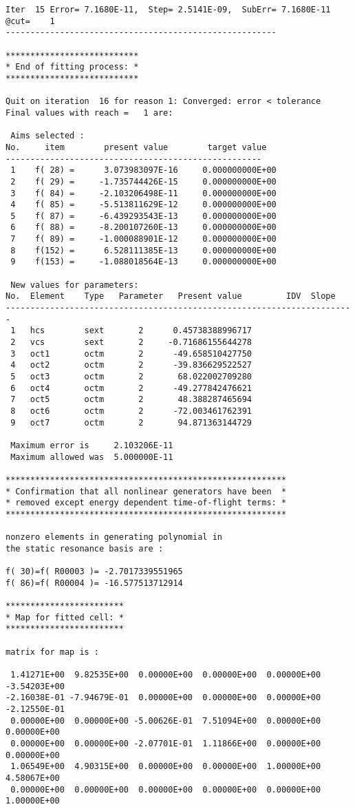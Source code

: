 \begin{footnotesize}
\begin{verbatim}
Iter  15 Error= 7.1680E-11,  Step= 2.5141E-09,  SubErr= 7.1680E-11 @cut=    1
-------------------------------------------------------

***************************
* End of fitting process: *
***************************

Quit on iteration  16 for reason 1: Converged: error < tolerance
Final values with reach =   1 are:

 Aims selected :
No.     item        present value        target value
----------------------------------------------------
 1    f( 28) =      3.073983097E-16     0.000000000E+00
 2    f( 29) =     -1.735744426E-15     0.000000000E+00
 3    f( 84) =     -2.103206498E-11     0.000000000E+00
 4    f( 85) =     -5.513811629E-12     0.000000000E+00
 5    f( 87) =     -6.439293543E-13     0.000000000E+00
 6    f( 88) =     -8.200107260E-13     0.000000000E+00
 7    f( 89) =     -1.000088901E-12     0.000000000E+00
 8    f(152) =      6.528111385E-13     0.000000000E+00
 9    f(153) =     -1.088018564E-13     0.000000000E+00

 New values for parameters:
No.  Element    Type   Parameter   Present value         IDV  Slope
-----------------------------------------------------------------------
 1   hcs        sext       2      0.45738388996717
 2   vcs        sext       2     -0.71686155644278
 3   oct1       octm       2      -49.658510427750
 4   oct2       octm       2      -39.836629522527
 5   oct3       octm       2       68.022002709280
 6   oct4       octm       2      -49.277842476621
 7   oct5       octm       2       48.388287465694
 8   oct6       octm       2      -72.003461762391
 9   oct7       octm       2       94.871363144729

 Maximum error is     2.103206E-11
 Maximum allowed was  5.000000E-11

*********************************************************
* Confirmation that all nonlinear generators have been  *
* removed except energy dependent time-of-flight terms: *
*********************************************************

nonzero elements in generating polynomial in
the static resonance basis are :

f( 30)=f( R00003 )= -2.7017339551965
f( 86)=f( R00004 )= -16.577513712914

************************
* Map for fitted cell: *
************************

matrix for map is :

 1.41271E+00  9.82535E+00  0.00000E+00  0.00000E+00  0.00000E+00 -3.54203E+00
-2.16038E-01 -7.94679E-01  0.00000E+00  0.00000E+00  0.00000E+00 -2.12550E-01
 0.00000E+00  0.00000E+00 -5.00626E-01  7.51094E+00  0.00000E+00  0.00000E+00
 0.00000E+00  0.00000E+00 -2.07701E-01  1.11866E+00  0.00000E+00  0.00000E+00
 1.06549E+00  4.90315E+00  0.00000E+00  0.00000E+00  1.00000E+00  4.58067E+00
 0.00000E+00  0.00000E+00  0.00000E+00  0.00000E+00  0.00000E+00  1.00000E+00


\end{verbatim}
\end{footnotesize}
